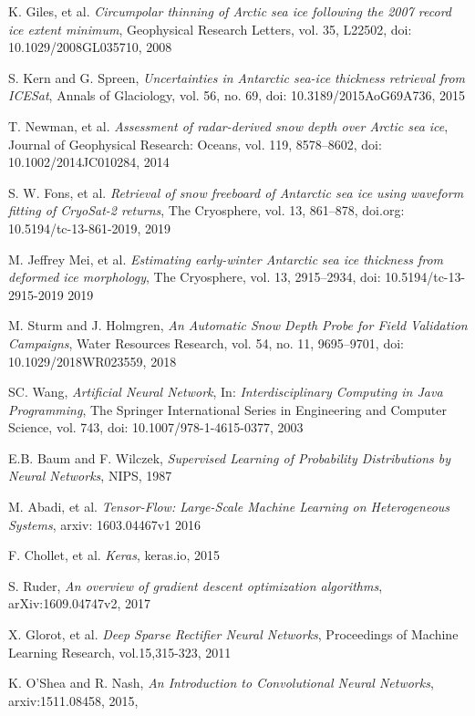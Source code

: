 \documentclass[11pt, a4paper]{article}
\begin{document}
\begin{thebibliography}{9}
	K. Giles, et al.
    \textit{Circumpolar thinning of Arctic sea ice following the 2007 record ice extent minimum},
    Geophysical Research Letters, vol. 35, L22502,
    doi: 10.1029/2008GL035710, 
    2008

	S. Kern and G. Spreen,
	\textit{Uncertainties in Antarctic sea-ice thickness retrieval from ICESat},
	Annals of Glaciology, vol. 56, no. 69, 
	doi: 10.3189/2015AoG69A736,
	2015
	
	T. Newman, et al.
	\textit{Assessment of radar-derived snow depth over Arctic sea ice},
	Journal of Geophysical Research: Oceans, vol. 119, 8578–8602,
	doi: 10.1002/2014JC010284,
	2014

	S. W. Fons, et al.
	\textit{Retrieval of snow freeboard of Antarctic sea ice using waveform fitting of CryoSat-2 returns},
	The Cryosphere, vol. 13, 861–878,
	doi.org: 10.5194/tc-13-861-2019,
	2019
	
	M. Jeffrey Mei, et al. 
	\textit{Estimating early-winter Antarctic sea ice thickness from deformed ice morphology},
	The Cryosphere, vol. 13, 2915–2934,
	doi: 10.5194/tc-13-2915-2019
	2019
	
	 M. Sturm and J. Holmgren,
	 \textit{An Automatic Snow Depth Probe for Field Validation Campaigns},
	 Water Resources Research, vol. 54, no. 11, 9695–9701,
	 doi: 10.1029/2018WR023559,
	 2018
	 
	SC. Wang,
	\textit{Artificial Neural Network}, In: \textit{Interdisciplinary Computing in Java Programming},
	The Springer International Series in Engineering and Computer Science, vol. 743,
	doi: 10.1007/978-1-4615-0377,
	2003

	E.B. Baum and F. Wilczek,
	\textit{Supervised Learning of Probability Distributions by Neural Networks},
	NIPS,
	1987
		
	M. Abadi, et al.
	\textit{Tensor-Flow: Large-Scale Machine Learning on Heterogeneous Systems},
	arxiv: 1603.04467v1
	2016
	
	F.  Chollet, et al.
	\textit{Keras},
	keras.io,
	2015
 
	S. Ruder,
	\textit{An overview of gradient descent optimization algorithms},
	arXiv:1609.04747v2,
	2017
		
	X. Glorot, et al.
	\textit{Deep Sparse Rectifier Neural Networks},
	Proceedings of Machine Learning Research, vol.15,315-323,
	2011
	
	K. O'Shea and R. Nash,
	\textit{An Introduction to Convolutional Neural Networks},
	arxiv:1511.08458,
	2015,
	
\end{thebibliography} %
\end{document}

